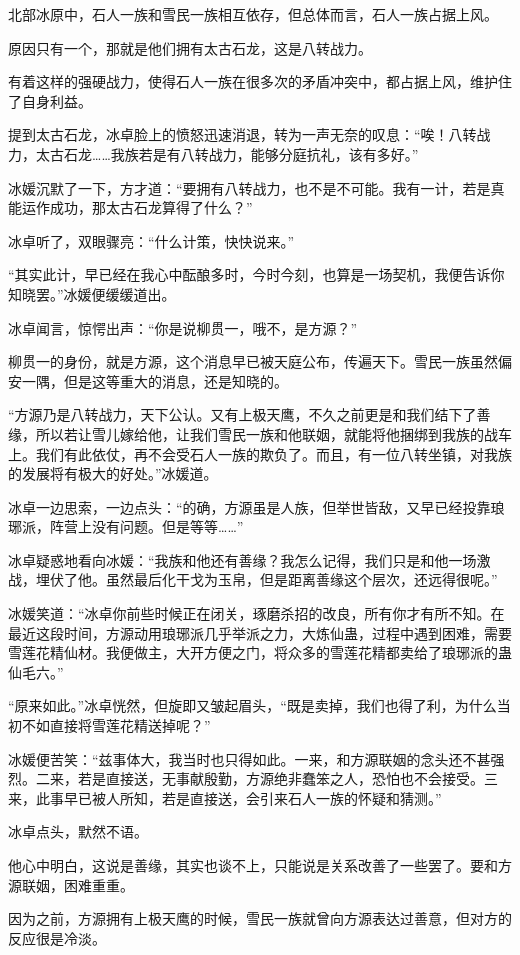 \begin{this_body}
北部冰原中，石人一族和雪民一族相互依存，但总体而言，石人一族占据上风。

原因只有一个，那就是他们拥有太古石龙，这是八转战力。

有着这样的强硬战力，使得石人一族在很多次的矛盾冲突中，都占据上风，维护住了自身利益。

提到太古石龙，冰卓脸上的愤怒迅速消退，转为一声无奈的叹息：“唉！八转战力，太古石龙……我族若是有八转战力，能够分庭抗礼，该有多好。”

冰媛沉默了一下，方才道：“要拥有八转战力，也不是不可能。我有一计，若是真能运作成功，那太古石龙算得了什么？”

冰卓听了，双眼骤亮：“什么计策，快快说来。”

“其实此计，早已经在我心中酝酿多时，今时今刻，也算是一场契机，我便告诉你知晓罢。”冰媛便缓缓道出。

冰卓闻言，惊愕出声：“你是说柳贯一，哦不，是方源？”

柳贯一的身份，就是方源，这个消息早已被天庭公布，传遍天下。雪民一族虽然偏安一隅，但是这等重大的消息，还是知晓的。

“方源乃是八转战力，天下公认。又有上极天鹰，不久之前更是和我们结下了善缘，所以若让雪儿嫁给他，让我们雪民一族和他联姻，就能将他捆绑到我族的战车上。我们有此依仗，再不会受石人一族的欺负了。而且，有一位八转坐镇，对我族的发展将有极大的好处。”冰媛道。

冰卓一边思索，一边点头：“的确，方源虽是人族，但举世皆敌，又早已经投靠琅琊派，阵营上没有问题。但是等等……”

冰卓疑惑地看向冰媛：“我族和他还有善缘？我怎么记得，我们只是和他一场激战，埋伏了他。虽然最后化干戈为玉帛，但是距离善缘这个层次，还远得很呢。”

冰媛笑道：“冰卓你前些时候正在闭关，琢磨杀招的改良，所有你才有所不知。在最近这段时间，方源动用琅琊派几乎举派之力，大炼仙蛊，过程中遇到困难，需要雪莲花精仙材。我便做主，大开方便之门，将众多的雪莲花精都卖给了琅琊派的蛊仙毛六。”

“原来如此。”冰卓恍然，但旋即又皱起眉头，“既是卖掉，我们也得了利，为什么当初不如直接将雪莲花精送掉呢？”

冰媛便苦笑：“兹事体大，我当时也只得如此。一来，和方源联姻的念头还不甚强烈。二来，若是直接送，无事献殷勤，方源绝非蠢笨之人，恐怕也不会接受。三来，此事早已被人所知，若是直接送，会引来石人一族的怀疑和猜测。”

冰卓点头，默然不语。

他心中明白，这说是善缘，其实也谈不上，只能说是关系改善了一些罢了。要和方源联姻，困难重重。

因为之前，方源拥有上极天鹰的时候，雪民一族就曾向方源表达过善意，但对方的反应很是冷淡。


\end{this_body}
